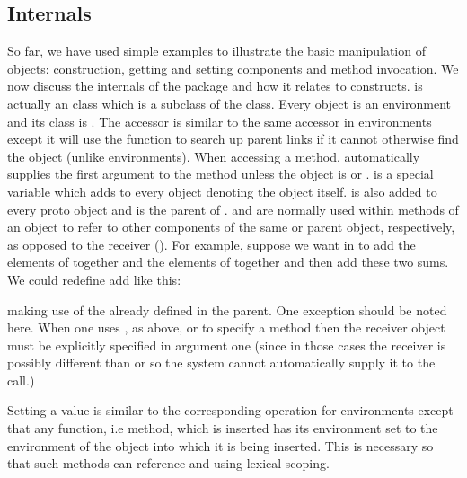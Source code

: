\documentclass{Z}
\begin{document}
\subsection{Internals}
\label{sec:internals}

So far, we have used simple examples to illustrate the basic manipulation
of objects: construction, getting and setting components and method 
invocation.  We now discuss the internals of the package and how it relates
to  constructs.  
 is actually an  class which is a subclass
of the  class.  Every  object is an
environment and its class is .  The \code{\$}
accessor is similar to the same accessor in environments except it will
use the   function to 
search up parent links if it cannot otherwise find the object (unlike
environments).  When accessing a method, \code{\$} 
automatically supplies the
first argument to the method
unless the object is  or .  
is a special variable which  adds to every  object
denoting the object itself.   is also added to every
proto object and is the parent of .  
and  are normally used
within methods of an object to refer to other components of the same
or parent object, respectively,
as opposed to the receiver ().  For example,
suppose we want  in  to add the elements
of  together and the elements of
 together and then add these two sums.  We could redefine add like this:

\begin{Schunk}
\end{Schunk}

making use of the  already defined in the parent.
One exception should be noted here.  When one uses ,
as above, or  to specify a method then the receiver
object must be explicitly specified 
in argument one (since in those cases the receiver
is possibly different than
 or  so the system cannot automatically supply it
to the call.)

Setting a value is similar to the corresponding operation for
environments except that any function, i.e method, which is
inserted has its environment set to the environment of the object
into which it is being inserted.  This is necessary so that such
methods can reference  and  using
lexical scoping.  
\end{document}

